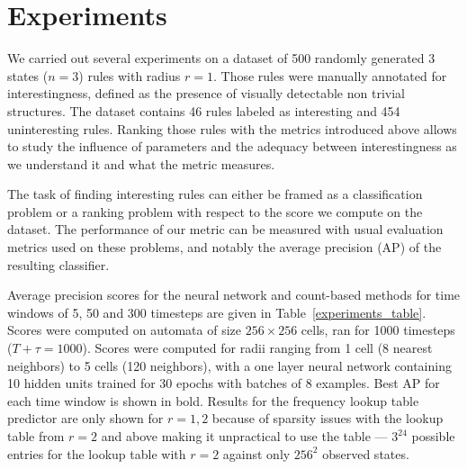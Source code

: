 \section{Experiments}\label{sec:experiments}

We carried out several experiments on a dataset of 500 randomly generated 3
states ($n=3$) rules with radius $r=1$. Those rules were manually annotated for
interestingness, defined as the presence of visually detectable non trivial
structures. The dataset contains 46 rules labeled as interesting and 454
uninteresting rules. Ranking those rules with the metrics introduced above
allows to study the influence of parameters and the adequacy between
interestingness as we understand it and what the metric measures.

The task of finding interesting rules can either be framed as a classification
problem or a ranking problem with respect to the score we compute on the
dataset. The performance of our metric can be measured with usual evaluation
metrics used on these problems, and notably the average precision (AP) of the
resulting classifier.

Average precision scores for the neural network and count-based methods for time
windows of 5, 50 and 300 timesteps are given in Table~\ref{experiments_table}.
Scores were computed on automata of size $256\times 256$ cells, ran for 1000
timesteps ($T + \tau = 1000$). Scores were computed for radii ranging from 1
cell (8 nearest neighbors) to 5 cells (120 neighbors), with a one layer neural
network containing 10 hidden units trained for 30 epochs with batches
of 8 examples. Best AP for each time window is shown in bold.
Results for the frequency lookup table predictor are only shown for $r=1, 2$
because of sparsity issues with the lookup table from $r=2$ and above making it
unpractical to use the table --- $3^{24}$ possible entries for the lookup table
with $r=2$ against only $256^2$ observed states.

